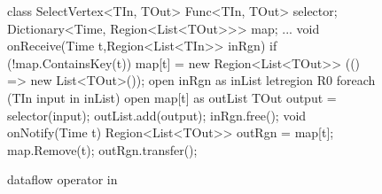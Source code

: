 \begin{figure}[t!]
\begin{numcodejava}
class SelectVertex<TIn, TOut> {
  Func<TIn, TOut> selector;
  Dictionary<Time, Region<List<TOut>>> map;
  ...
  void onReceive(Time t,Region<List<TIn>> inRgn){
    if (!map.ContainsKey(t))
       map[t] = new Region<List<TOut>> 
                  (() => new List<TOut>());
    open inRgn as inList {
      letregion R0 {
        foreach (TIn input in inList) {
          open map[t] as outList {
            TOut output = selector(input);
            outList.add(output); } } } }
    inRgn.free();
  }
  void onNotify(Time t) {
     Region<List<TOut>> outRgn = map[t];
     map.Remove(t);
     outRgn.transfer();
  }
}
\end{numcodejava}
\caption{ dataflow operator in \name}
\label{fig:motivating-eg-in-broom}
\vspace*{-0.15in}
\end{figure}

